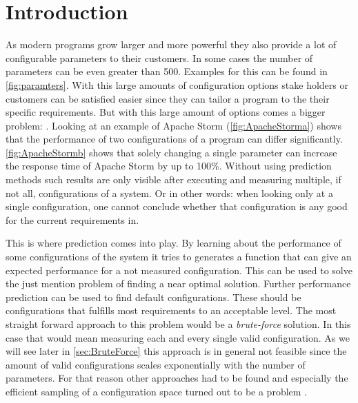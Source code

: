 
\section{Introduction} \label{sec:introduction}

As modern programs grow larger and more powerful they also provide a lot of configurable parameters to their customers. In some cases the number of parameters can be even greater than 500. Examples for this can be found in \cref{fig:paramters}. With this large amounts of configuration options stake holders or customers can be satisfied easier since they can tailor a program to the their specific requirements. But with this large amount of options comes a bigger problem: . Looking at an example of Apache Storm (\cref{fig:ApacheStorma}) shows that the performance of two configurations of a program can differ significantly. \cref{fig:ApacheStormb} shows that solely changing a single parameter can increase the response time of Apache Storm by up to 100\%. Without using prediction methods such results are only visible after executing and measuring multiple, if not all, configurations of a system. Or in other words: when looking only at a single configuration, one cannot conclude whether that configuration is any good for the current requirements in.

This is where prediction comes into play. By learning about the performance of some configurations of the system it tries to generates a function that can give an expected performance for a not measured configuration. This can be used to solve the just mention problem of finding a near optimal solution.
Further performance prediction can be used to find default configurations. These should be configurations that fulfills most requirements to an acceptable level. 
The most straight forward  approach to this problem would be a \textit{brute-force} solution. In this case that would mean measuring each and every single valid configuration. As we will see later in \cref{sec:BruteForce} this approach is in general not feasible since the amount of valid configurations scales exponentially with the number of parameters. For that reason other approaches had to be found and especially the efficient sampling of a configuration space turned out to be a problem \cite{CostEfficientSampling_Gou_Siegmund_2015}.

